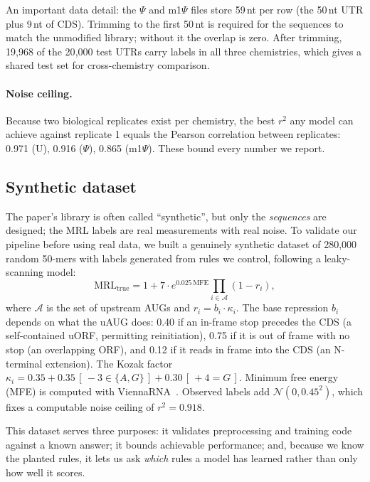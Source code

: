\documentclass{article}
\begin{document}
An important data detail: the $\Psi$ and m1$\Psi$ files store 59\,nt per row (the 50\,nt UTR
plus 9\,nt of CDS). Trimming to the first 50\,nt is required for the sequences to match the
unmodified library; without it the overlap is zero. After trimming, 19{,}968 of the 20{,}000
test UTRs carry labels in all three chemistries, which gives a shared test set for
cross-chemistry comparison.

\paragraph{Noise ceiling.} Because two biological replicates exist per chemistry, the best
$r^2$ any model can achieve against replicate 1 equals the Pearson correlation between
replicates: 0.971 (U), 0.916 ($\Psi$), 0.865 (m1$\Psi$). These bound every number we report.

\subsection{Synthetic dataset}
\label{sec:synth}
The paper's library is often called ``synthetic'', but only the \emph{sequences} are
designed; the MRL labels are real measurements with real noise. To validate our pipeline
before using real data, we built a genuinely synthetic dataset of 280{,}000 random 50-mers
with labels generated from rules we control, following a leaky-scanning model:
\begin{equation}
\mathrm{MRL}_{\text{true}} = 1 + 7 \cdot e^{0.025\,\mathrm{MFE}} \prod_{i \in \mathcal{A}} (1 - r_i),
\end{equation}
where $\mathcal{A}$ is the set of upstream AUGs and $r_i = b_i \cdot \kappa_i$. The base
repression $b_i$ depends on what the uAUG does: 0.40 if an in-frame stop precedes the CDS
(a self-contained uORF, permitting reinitiation), 0.75 if it is out of frame with no stop
(an overlapping ORF), and 0.12 if it reads in frame into the CDS (an N-terminal extension).
The Kozak factor $\kappa_i = 0.35 + 0.35\,[\,-3 \in \{A,G\}\,] + 0.30\,[\,+4 = G\,]$.
Minimum free energy (MFE) is computed with ViennaRNA~\citep{lorenz2011}. Observed labels add
$\mathcal{N}(0, 0.45^2)$, which fixes a computable noise ceiling of $r^2 = 0.918$.

This dataset serves three purposes: it validates preprocessing and training code against a
known answer; it bounds achievable performance; and, because we know the planted rules, it
lets us ask \emph{which} rules a model has learned rather than only how well it scores.
\end{document}
